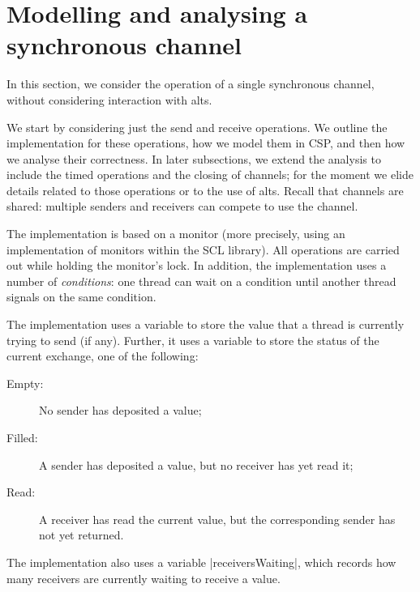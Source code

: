 \section{Modelling and analysing a  synchronous channel}
\label{sec:syncchan}

\inlineScala

In this section, we consider the operation of a single synchronous channel,
without considering interaction with alts.

We start by considering just the send and receive operations.  We outline the
implementation for these operations, how we model them in CSP, and then how we
analyse their correctness.  In later subsections, we extend the analysis to
include the timed operations and the closing of channels; for the moment we
elide details related to those operations or to the use of alts.  Recall that
channels are shared: multiple senders and receivers can compete to use the
channel.

The implementation is based on a monitor (more precisely, using an
implementation of monitors within the SCL library).  All operations are
carried out while holding the monitor's lock.  In addition, the implementation
uses a number of \emph{conditions}: one thread can wait on a condition until
another thread signals on the same condition.

The implementation uses a variable  to store the value that a
thread is currently trying to send (if any).  Further, it uses a variable
 to store the status of the current exchange, one of the
following: 
\begin{description}
\item[{\scalastyle Empty}:] No sender has deposited a value;
\item[{\scalastyle Filled}:] A sender has deposited a value, but no receiver
  has yet read it;
\item[{\scalastyle Read}:] A receiver has read the current value, but the
  corresponding sender has not yet returned.
\end{description}
%
The implementation also uses a variable |receiversWaiting|, which records how
many receivers are currently waiting to receive a value. 


